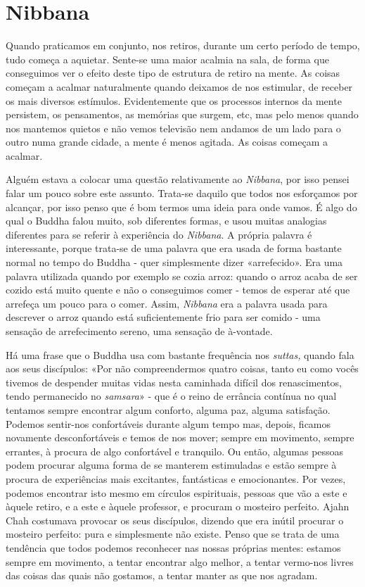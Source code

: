 \chapter{Nibbana}

Quando praticamos em conjunto, nos retiros, durante um certo período de
tempo, tudo começa a aquietar. Sente-se uma maior acalmia na sala, de
forma que conseguimos ver o efeito deste tipo de estrutura de retiro na
mente. As coisas começam a acalmar naturalmente quando deixamos de nos
estimular, de receber os mais diversos estímulos. Evidentemente que os
processos internos da mente persistem, os pensamentos, as memórias que
surgem, etc, mas pelo menos quando nos mantemos quietos e não vemos
televisão nem andamos de um lado para o outro numa grande cidade, a
mente é menos agitada. As coisas começam a acalmar.

Alguém estava a colocar uma questão relativamente ao \emph{Nibbana}, por
isso pensei falar um pouco sobre este assunto. Trata-se daquilo que
todos nos esforçamos por alcançar, por isso penso que é bom termos uma
ideia para onde vamos. É algo do qual o Buddha falou muito, sob
diferentes formas, e usou muitas analogias diferentes para se referir à
experiência do \emph{Nibbana}. A própria palavra é interessante, porque
trata-se de uma palavra que era usada de forma bastante normal no tempo
do Buddha - quer simplesmente dizer «arrefecido». Era uma palavra
utilizada quando por exemplo se cozia arroz: quando o arroz acaba de ser
cozido está muito quente e não o conseguimos comer - temos de esperar
até que arrefeça um pouco para o comer. Assim, \emph{Nibbana} era a
palavra usada para descrever o arroz quando está suficientemente frio
para ser comido - uma sensação de arrefecimento sereno, uma sensação de
à-vontade.

Há uma frase que o Buddha usa com bastante frequência nos \emph{suttas,}
quando fala aos seus discípulos: «Por não compreendermos quatro coisas,
tanto eu como vocês tivemos de despender muitas vidas nesta caminhada
difícil dos renascimentos, tendo permanecido no \emph{samsara}» - que é
o reino de errância contínua no qual tentamos sempre encontrar algum
conforto, alguma paz, alguma satisfação. Podemos sentir-nos confortáveis
durante algum tempo mas, depois, ficamos novamente desconfortáveis e
temos de nos mover; sempre em movimento, sempre errantes, à procura de
algo confortável e tranquilo. Ou então, algumas pessoas podem procurar
alguma forma de se manterem estimuladas e estão sempre à procura de
experiências mais excitantes, fantásticas e emocionantes. Por vezes,
podemos encontrar isto mesmo em círculos espirituais, pessoas que vão a
este e àquele retiro, e a este e àquele professor, e procuram o mosteiro
perfeito. Ajahn Chah costumava provocar os seus discípulos, dizendo que
era inútil procurar o mosteiro perfeito: pura e simplesmente não existe.
Penso que se trata de uma tendência que todos podemos reconhecer nas
nossas próprias mentes: estamos sempre em movimento, a tentar encontrar
algo melhor, a tentar vermo-nos livres das coisas das quais não
gostamos, a tentar manter as que nos agradam.

